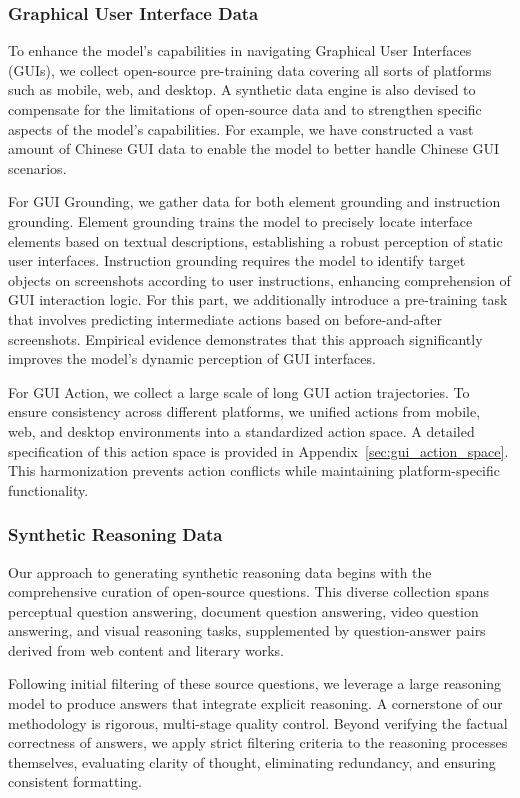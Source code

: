 \subsubsection{Graphical User Interface Data}


To enhance the model's capabilities in navigating Graphical User Interfaces (GUIs), we collect open-source pre-training data covering all sorts of platforms such as mobile, web, and desktop. A synthetic data engine is also devised to compensate for the limitations of open-source data and to strengthen specific aspects of the model's capabilities. For example, we have constructed a vast amount of Chinese GUI data to enable the model to better handle Chinese GUI scenarios.

For GUI Grounding, we gather data for both element grounding and instruction grounding. Element grounding trains the model to precisely locate interface elements based on textual descriptions, establishing a robust perception of static user interfaces. Instruction grounding requires the model to identify target objects on screenshots according to user instructions, enhancing comprehension of GUI interaction logic. For this part, we additionally introduce a pre-training task that involves predicting intermediate actions based on before-and-after screenshots. Empirical evidence demonstrates that this approach significantly improves the model's dynamic perception of GUI interfaces.

For GUI Action, we collect a large scale of long GUI action trajectories. To ensure consistency across different platforms, we unified actions from mobile, web, and desktop environments into a standardized action space. A detailed specification of this action space is provided in Appendix~\ref{sec:gui_action_space}. This harmonization prevents action conflicts while maintaining platform-specific functionality.

\subsubsection{Synthetic Reasoning Data}
Our approach to generating synthetic reasoning data begins with the comprehensive curation of open-source questions. This diverse collection spans perceptual question answering, document question answering, video question answering, and visual reasoning tasks, supplemented by question-answer pairs derived from web content and literary works.

Following initial filtering of these source questions, we leverage a large reasoning model to produce answers that integrate explicit reasoning. A cornerstone of our methodology is rigorous, multi-stage quality control. Beyond verifying the factual correctness of answers, we apply strict filtering criteria to the reasoning processes themselves, evaluating clarity of thought, eliminating redundancy, and ensuring consistent formatting.


